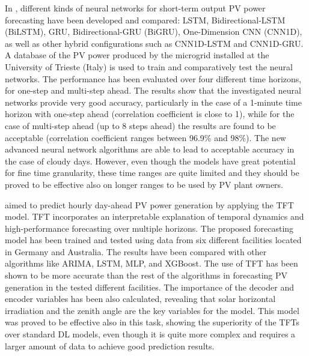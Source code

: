 In \cite{MELLIT2021276}, different kinds of neural networks for short-term output PV power forecasting have been developed and compared: LSTM, Bidirectional-LSTM (BiLSTM), GRU, Bidirectional-GRU (BiGRU), One-Dimension CNN (CNN1D), as well as other hybrid configurations such as CNN1D-LSTM and CNN1D-GRU.
A database of the PV power produced by the microgrid installed at the University of Trieste (Italy) is used to train and comparatively test the neural networks.
The performance has been evaluated over four different time horizons, for one-step and multi-step ahead.
The results show that the investigated neural networks provide very good accuracy, particularly in the case of a 1-minute time horizon with one-step ahead (correlation coefficient is close to 1), while for the case of multi-step ahead (up to 8 steps ahead) the results are found to be acceptable (correlation coefficient ranges between 96.9\% and 98\%).
The new advanced neural network algorithms are able to lead to acceptable accuracy in the case of cloudy days.
However, even though the models have great potential for fine time granularity, these time ranges are quite limited and they should be proved to be effective also on longer ranges to be used by PV plant owners.

\cite{en15145232} aimed to predict hourly day-ahead PV power generation by applying the TFT model.
TFT incorporates an interpretable explanation of temporal dynamics and high-performance forecasting over multiple horizons.
The proposed forecasting model has been trained and tested using data from six different facilities located in Germany and Australia.
The results have been compared with other algorithms like ARIMA, LSTM, MLP, and XGBoost.
The use of TFT has been shown to be more accurate than the rest of the algorithms in forecasting PV generation in the tested different facilities.
The importance of the decoder and encoder variables has been also calculated, revealing that solar horizontal irradiation and the zenith angle are the key variables for the model.
This model was proved to be effective also in this task, showing the superiority of the TFTs over standard DL models, even though it is quite more complex and requires a larger amount of data to achieve good prediction results.
